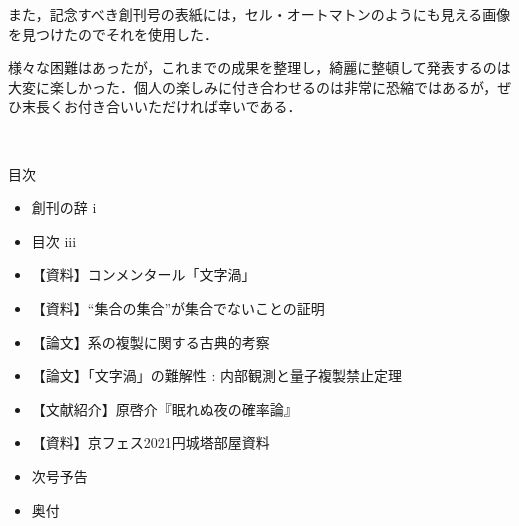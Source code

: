 \documentclass[10pt, a5paper, twoside]{jsarticle}
\theoremstyle{definition}
\begin{document}
	また，記念すべき創刊号の表紙には，セル・オートマトンのようにも見える画像を見つけたのでそれを使用した．

	様々な困難はあったが，これまでの成果を整理し，綺麗に整頓して発表するのは大変に楽しかった．個人の楽しみに付き合わせるのは非常に恐縮ではあるが，ぜひ末長くお付き合いいただければ幸いである．


	\clearpage

	\begin{center}

	~ %

		\Large{目次}

	\end{center}

	\begin{itemize}
		\item 創刊の辞 \dotfill i

			\vspace{3mm}

		\item 目次 \dotfill iii

			\vspace{3mm}

		\item 【資料】コンメンタール「文字渦」 

			\vspace{3mm}

		\item 【資料】“集合の集合”が集合でないことの証明 

			\vspace{3mm}

		\item 【論文】系の複製に関する古典的考察 

			\vspace{3mm}

		\item 【論文】「文字渦」の難解性 : 内部観測と量子複製禁止定理 

			\vspace{3mm}

		\item 【文献紹介】原啓介『眠れぬ夜の確率論』 

			\vspace{3mm}

		\item 【資料】京フェス2021円城塔部屋資料 

			\vspace{3mm}

		\item 次号予告 

			\vspace{3mm}

		\item 奥付 

	\end{itemize}
\end{document}
